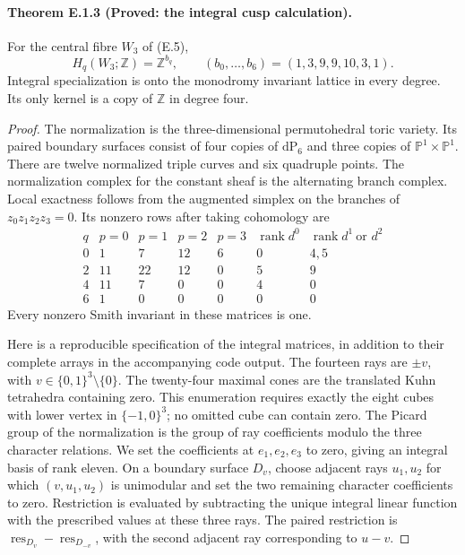 \paragraph{Theorem E.1.3 (Proved: the integral cusp calculation).}
For the central fibre $W_3$ of (E.5),
\[
 H_q(W_3;\mathbb Z)=\mathbb Z^{b_q},\qquad
 (b_0,\ldots,b_6)=(1,3,9,9,10,3,1).
 \tag{E.6}
\]
Integral specialization is onto the monodromy invariant lattice in
every degree.  Its only kernel is a copy of $\mathbb Z$ in degree four.

\begin{proof}
The normalization is the three-dimensional permutohedral toric variety.
Its paired boundary surfaces consist of four copies of $\mathrm{dP}_6$
and three copies of $\mathbb P^1\times\mathbb P^1$.  There are twelve
normalized triple curves and six quadruple points.  The normalization
complex for the constant sheaf is the alternating branch complex.
Local exactness follows from the augmented simplex on the branches
of $z_0z_1z_2z_3=0$.  Its nonzero rows after taking cohomology are
\[
\begin{array}{c|rrrr|rr}
q& p=0&p=1&p=2&p=3&\operatorname{rank}d^0&
 \operatorname{rank}d^1\ \text{or }d^2\\ \hline
0&1&7&12&6&0&4,5\\
2&11&22&12&0&5&9\\
4&11&7&0&0&4&0\\
6&1&0&0&0&0&0
\end{array}
\tag{E.7}
\]
Every nonzero Smith invariant in these matrices is one.

Here is a reproducible specification of the integral matrices, in
addition to their complete arrays in the accompanying code output.
The fourteen rays are $\pm v$, with
$v\in\{0,1\}^3\setminus\{0\}$.  The twenty-four maximal cones
are the translated Kuhn tetrahedra containing zero.  This enumeration
requires exactly the eight cubes with lower vertex in $\{-1,0\}^3$;
no omitted cube can contain zero.  The Picard group of the normalization
is the group of ray coefficients modulo the three character relations.
We set the coefficients at $e_1,e_2,e_3$ to zero, giving an integral
basis of rank eleven.  On a boundary surface $D_v$, choose adjacent
rays $u_1,u_2$ for which $(v,u_1,u_2)$ is unimodular and set the two
remaining character coefficients to zero.  Restriction is evaluated
by subtracting the unique integral linear function with the prescribed
values at these three rays.  The paired restriction is
$\operatorname{res}_{D_v}-\operatorname{res}_{D_{-v}}$, with the
second adjacent ray corresponding to $u-v$.


\end{proof}
